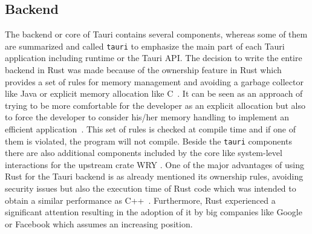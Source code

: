 \subsection{Backend}
\label{subsec:tauri:backend}
The backend or core of Tauri contains several components, whereas some of them are summarized and called \texttt{tauri} to emphasize the main part of each Tauri application including runtime or the Tauri \ac{API}.
The decision to write the entire backend in Rust was made because of the ownership feature in Rust which provides a set of rules for memory management and avoiding a garbage collector like Java or explicit memory allocation like C~\cite{tauri}.
It can be seen as an approach of trying to be more comfortable for the developer as an explicit allocation but also to force the developer to consider his/her memory handling to implement an efficient application~\cite{klabnik2019rust}.
This set of rules is checked at compile time and if one of them is violated, the program will not compile.
Beside the \texttt{tauri} components there are also additional components included by the core like system-level interactions for the upstream crate WRY .
One of the major advantages of using Rust for the Tauri backend is as already mentioned its ownership rules, avoiding security issues but also the execution time of Rust code which was intended to obtain a similar performance as C++~\cite{klabnik2019rust}.
Furthermore, Rust experienced a significant attention resulting in the adoption of it by big companies like Google or Facebook which assumes an increasing position.

